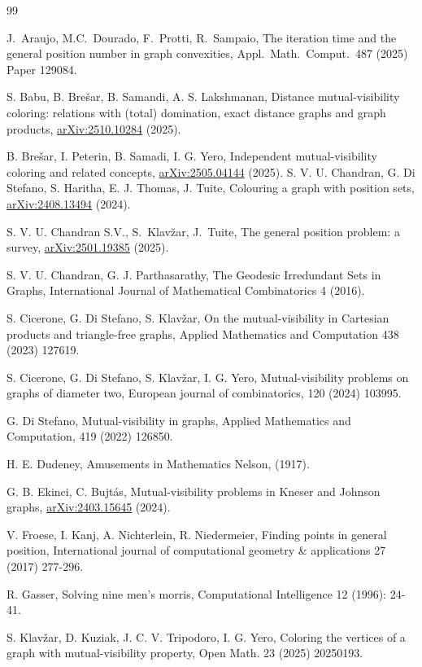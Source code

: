 \documentclass[12pt]{article}
\begin{document}
\begin{thebibliography}{99}

J.~Araujo, M.C.~Dourado, F.~Protti, R.~Sampaio, 
The iteration time and the general position number in graph convexities, 
Appl.\ Math.\ Comput.\ 487 (2025) Paper 129084. 

 S. Babu, B. Brešar, B. Samandi, A. S. Lakshmanan, Distance mutual-visibility coloring: relations with (total) domination, exact distance graphs and graph products, \url{arXiv:2510.10284} (2025).

 B. Brešar, I. Peterin, B. Samadi, I. G. Yero, Independent mutual-visibility coloring and related concepts, \url{arXiv:2505.04144} (2025).
 S. V. U. Chandran, G. Di Stefano, S. Haritha, E. J. Thomas, J. Tuite, Colouring a graph with position sets, \url{arXiv:2408.13494} (2024).
 
 S. V. U. Chandran S.V., S.~Klav\v{z}ar, J.~Tuite, 
The general position problem: a survey, \url{arXiv:2501.19385} (2025).

 S. V. U. Chandran, G. J. Parthasarathy, The Geodesic Irredundant Sets in Graphs, International Journal of Mathematical Combinatorics 4 (2016).

 S. Cicerone, G. Di Stefano, S. Klavžar, On the mutual-visibility in Cartesian products and triangle-free graphs, Applied Mathematics and Computation 438 (2023) 127619.

 S. Cicerone, G. Di Stefano, S. Klavžar, I. G. Yero, Mutual-visibility problems on graphs of diameter two, European journal of combinatorics, 120 (2024) 103995.

 G. Di Stefano, Mutual-visibility in graphs, Applied Mathematics and Computation, 419 (2022) 126850.
 
 H. E. Dudeney, Amusements in Mathematics Nelson, (1917).

 G. B. Ekinci, C. Bujtás, Mutual-visibility problems in Kneser and Johnson graphs, \url{arXiv:2403.15645} (2024).

 V. Froese, I. Kanj, A. Nichterlein, R. Niedermeier, Finding points in general position, International journal of computational geometry \& applications 27 (2017) 277-296.

 R. Gasser, Solving nine men's morris, Computational Intelligence 12 (1996): 24-41.

 S. Klavžar, D. Kuziak, J. C. V. Tripodoro, I. G. Yero, Coloring the vertices of a graph with mutual-visibility property, Open Math. 23 (2025) 20250193.


\end{thebibliography}
\end{document}
